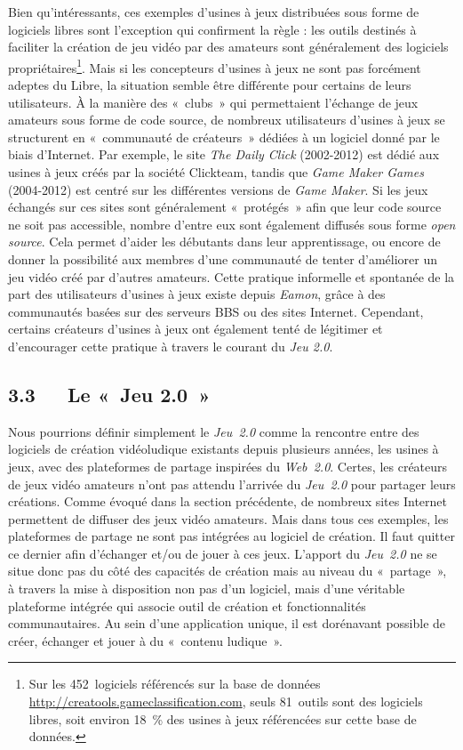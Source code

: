 \documentclass{FramateX}
\begin{document}
\begin{refsection}
Bien qu'intéressants, ces exemples d'usines à jeux distribuées sous
forme de logiciels libres sont l'exception qui confirment la règle :
les outils destinés à faciliter la création de jeu vidéo par des
amateurs sont généralement des logiciels propriétaires\footnote{Sur
les 452~logiciels référencés sur la base de données
\url{http://creatools.gameclassification.com}, seuls 81~outils sont
des logiciels libres, soit environ 18~\% des usines à jeux référencées
sur cette base de données.}. Mais si les concepteurs d'usines à jeux ne
sont pas forcément adeptes du Libre, la situation semble être
différente pour certains de leurs utilisateurs. À la manière des
«~clubs~» qui permettaient l'échange de jeux amateurs sous forme de
code source, de nombreux utilisateurs d'usines à jeux se structurent en
«~communauté de créateurs~» dédiées à un logiciel donné par le biais
d'Internet. Par exemple, le site \textit{The
Daily Click} (2002-2012) est dédié aux usines à jeux créés par la
société Clickteam, tandis que
\textit{Game Maker Games} (2004-2012) est
centré sur les différentes versions de
\textit{Game Maker}. Si les jeux échangés sur
ces sites sont généralement «~protégés~» afin que leur code source ne
soit pas accessible, nombre d'entre eux sont également diffusés sous
forme \textit{open source}. Cela permet d'aider les débutants dans leur
apprentissage, ou encore de donner la possibilité aux membres d'une
communauté de tenter d'améliorer un jeu vidéo créé par d'autres
amateurs. Cette pratique informelle et spontanée de la part des
utilisateurs d'usines à jeux existe depuis
\textit{Eamon}, grâce à des communautés
basées sur des serveurs BBS ou des sites Internet. Cependant, certains
créateurs d'usines à jeux ont également tenté de légitimer et
d'encourager cette pratique à travers le courant du
\textit{Jeu 2.0}. 

\subsection*{3.3~~~Le «~Jeu 2.0~»}
{}

Nous pourrions définir simplement le
\textit{Jeu~2.0} comme la rencontre entre des
logiciels de création vidéoludique existants depuis plusieurs années,
les usines à jeux, avec des plateformes de partage inspirées du
\textit{Web~2.0}. Certes, les créateurs de
jeux vidéo amateurs n'ont pas attendu l'arrivée du
\textit{Jeu~2.0} pour partager leurs
créations. Comme évoqué dans la section précédente, de nombreux sites
Internet permettent de diffuser des jeux vidéo amateurs. Mais dans tous
ces exemples, les plateformes de partage ne sont pas intégrées au
logiciel de création. Il faut quitter ce dernier afin d'échanger et/ou
de jouer à ces jeux. L'apport du
\textit{Jeu~2.0} ne se situe donc pas du côté
des capacités de création mais au niveau du «~partage~», à travers la
mise à disposition non pas d'un logiciel, mais d'une véritable
plateforme intégrée qui associe outil de création et fonctionnalités
communautaires. Au sein d'une application unique, il est dorénavant
possible de créer, échanger et jouer à du «~contenu ludique~». 


\end{refsection}
\end{document}
